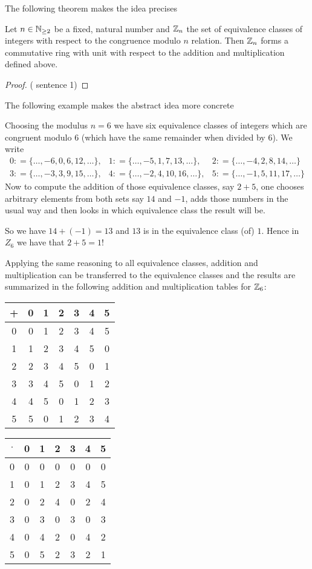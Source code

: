 The following theorem makes the idea precises
\begin{theorem}
\label{def: residual class ring}
Let $ n \in \mathbb{N} _{\geq 2} $ be a fixed, natural number and
$ \mathbb{Z}_n $ the set of equivalence classes of integers with respect to the  congruence modulo $ n $ relation. Then $ \mathbb{Z}_n $ forms a commutative ring with unit with respect to the addition and multiplication defined above.
\end{theorem}
\begin{proof} (\cite{AL} sentence 1)  
\end{proof}
The following example makes the abstract idea more concrete
\begin{example} 
\label{z_6}
Choosing the modulus $ n = 6 $ we have six equivalence classes of integers which are congruent modulo $ 6 $ (which have the same remainder when divided by $6$). We write
$$
\begin{array}{lll}
0: = \{\ldots, -6,0,6,12, \ldots \}, &
1: = \{\ldots, -5,1,7,13, \ldots \}, &
2: = \{\ldots, -4,2,8,14, \ldots \} \\
3: = \{\ldots, -3,3,9,15, \ldots \}, &
4: = \{\ldots, -2,4,10,16, \ldots \}, &
5: = \{\ldots, -1,5,11,17, \ldots \}
\end{array}
$$
Now to compute the addition of those equivalence classes, say $2+5$, one chooses arbitrary elements from both sets say $14$ and $-1$, adds those numbers in the usual way and then looks in which equivalence class the result will be. 

So we have $14+(-1)=13$ and $13$ is in the equivalence class (of) $1$. Hence in $Z_6$ we have that $2+5=1$!

Applying the same reasoning to all equivalence classes, addition and multiplication can  be transferred to the equivalence classes and the results are summarized in the following addition and multiplication tables for $ \mathbb{Z}_6 $:
\begin{center}
  \begin{tabular}{c | c c c c c c}
    + & 0 & 1 & 2 & 3 & 4 & 5\\\hline
    0 & 0 & 1 & 2 & 3 & 4 & 5 \\
    1 & 1 & 2 & 3 & 4 & 5 & 0\\
    2 & 2 & 3 & 4 & 5 & 0 & 1\\
    3 & 3 & 4 & 5 & 0 & 1 & 2\\
    4 & 4 & 5 & 0 & 1 & 2 & 3\\
    5 & 5 & 0 & 1 & 2 & 3 & 4
  \end{tabular} \quad \quad \quad \quad
  \begin{tabular}{c | c c c c c c}
$ \cdot $ & 0 & 1 & 2 & 3 & 4 & 5 \\\hline
        0 & 0 & 0 & 0 & 0 & 0 & 0\\
        1 & 0 & 1 & 2 & 3 & 4 & 5\\
        2 & 0 & 2 & 4 & 0 & 2 & 4\\
        3 & 0 & 3 & 0 & 3 & 0 & 3\\
        4 & 0 & 4 & 2 & 0 & 4 & 2\\
        5 & 0 & 5 & 2 & 3 & 2 & 1
  \end{tabular}
\end{center}


\end{example}
